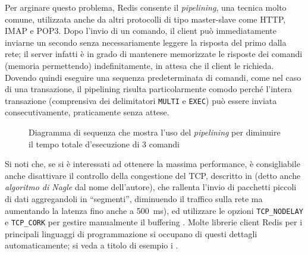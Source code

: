 Per arginare questo problema, Redis consente il \emph{pipelining}, una tecnica molto comune, 
utilizzata anche da altri protocolli di tipo master-slave come HTTP, IMAP e POP3. Dopo l'invio 
di un comando, il client può immediatamente inviarne un secondo senza necessariamente leggere
la risposta del primo dalla rete; il server infatti è in grado di mantenere memorizzate le risposte
dei comandi (memoria permettendo) indefinitamente, in attesa che il client le richieda. Dovendo
quindi eseguire una sequenza predeterminata di comandi, come nel caso di una transazione, il
pipelining risulta particolarmente comodo perché l'intera transazione (comprensiva dei delimitatori
\verb|MULTI| e \verb|EXEC|) può essere inviata consecutivamente, praticamente senza attese.

\begin{figure}
	\centering
	\begin{minipage}[t]{0.4\textwidth}
	\end{minipage}
	\qquad
	\begin{minipage}[t]{0.4\textwidth}
	\end{minipage}

	\caption{Diagramma di sequenza che mostra l'uso del \emph{pipelining} per diminuire
		il tempo totale d'e\-se\-cu\-zio\-ne di 3 comandi}
\end{figure}

Si noti che, se si è interessati ad ottenere la massima performance, è consigliabile anche
disattivare il controllo della congestione del TCP, descritto in
\cite{rfc896} (detto anche \emph{algoritmo di Nagle} dal nome
dell'autore), che rallenta l'invio di pacchetti piccoli di dati aggregandoli in ``segmenti'',
diminuendo il traffico sulla rete ma aumentando la latenza fino anche a \SI{500}{\milli\second}), ed
utilizzare le opzioni \verb|TCP_NODELAY| e \verb|TCP_CORK| per gestire manualmente il buffering
\cite{tcp-cork}. Molte librerie client Redis per i principali linguaggi di programmazione si
occupano di questi dettagli automaticamente; si veda a titolo di esempio i 
.

